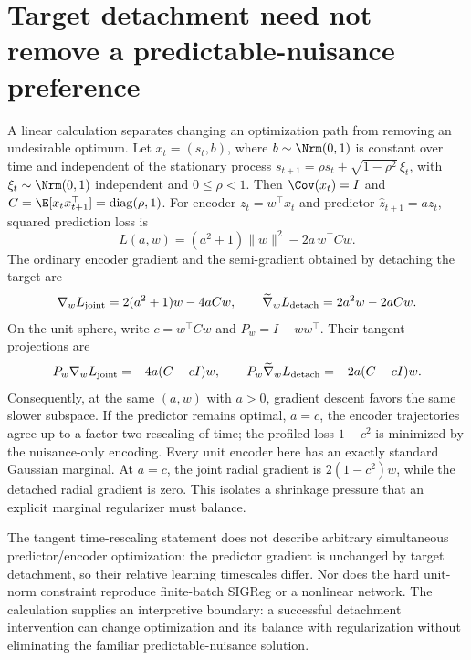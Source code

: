 \section{Target detachment need not remove a predictable-nuisance preference}
\label{app:linear-gradient}
A linear calculation separates changing an optimization path from removing an undesirable optimum.
Let $x_t=(s_t,b)$, where $b\sim\Nrm(0,1)$ is constant over time and independent of the stationary
process $s_{t+1}=\rho s_t+\sqrt{1-\rho^2}\,\xi_t$, with $\xi_t\sim\Nrm(0,1)$ independent and
$0\le\rho<1$. Then $\Cov(x_t)=I$ and $C=\E[x_t x_{t+1}^{\top}]=\operatorname{diag}(\rho,1)$.
For encoder $z_t=w^\top x_t$ and predictor $\widehat z_{t+1}=a z_t$, squared prediction loss is
\[
L(a,w)=(a^2+1)\|w\|^2-2a\,w^\top Cw.
\]
The ordinary encoder gradient and the semi-gradient obtained by detaching the target are
\[
\nabla_w L_{\rm joint}=2(a^2+1)w-4aCw,
\qquad
\widetilde\nabla_w L_{\rm detach}=2a^2w-2aCw.
\]
On the unit sphere, write $c=w^\top Cw$ and $P_w=I-ww^\top$. Their tangent projections are
\[
P_w\nabla_w L_{\rm joint}=-4a(C-cI)w,
\qquad
P_w\widetilde\nabla_w L_{\rm detach}=-2a(C-cI)w.
\]
Consequently, at the same $(a,w)$ with $a>0$, gradient descent favors the same slower subspace.
If the predictor remains optimal, $a=c$, the encoder trajectories agree up to a factor-two
rescaling of time; the profiled loss $1-c^2$ is minimized by the nuisance-only encoding.
Every unit encoder here has an exactly standard Gaussian marginal.
At $a=c$, the joint radial gradient is $2(1-c^2)w$, while the detached radial gradient is zero.
This isolates a shrinkage pressure that an explicit marginal regularizer must balance.

The tangent time-rescaling statement does not describe arbitrary simultaneous predictor/encoder
optimization: the predictor gradient is unchanged by target detachment, so their relative learning
timescales differ. Nor does the hard unit-norm constraint reproduce finite-batch SIGReg or a nonlinear
network. The calculation supplies an interpretive boundary: a successful detachment intervention
can change optimization and its balance with regularization without eliminating the familiar
predictable-nuisance solution.
